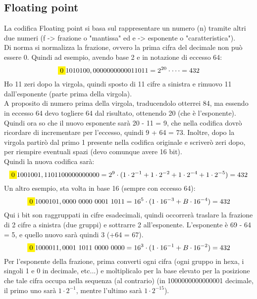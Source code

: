 \documentclass[12pt]{article}
\begin{document}
\subsection{Floating point}
La codifica Floating point si basa sul rappresentare un numero (n) tramite altri due numeri (f -> frazione o "mantissa" ed e -> esponente o "caratteristica").\\
Di norma si normalizza la frazione, ovvero la prima cifra del decimale non può essere 0. Quindi ad esempio, avendo base 2 e in notazione di eccesso 64:
\[
    \colorbox{yellow}{0}1010100,0000000000011011 = 2^{20} \cdot \dots = 432
\]
Ho 11 zeri dopo la virgola, quindi sposto di 11 cifre a sinistra e rimuovo 11 dall'esponente (parte prima della virgola).\\
A proposito di numero prima della virgola, traducendolo otterrei 84, ma essendo in eccesso 64 devo togliere 64 dal risultato, ottenendo 20 (che è l'esponente). Quindi ora so che il nuovo esponente sarà 20 - 11 = 9, che nella codifica dovrò ricordare di incrementare per l'eccesso, quindi 9 + 64 = 73. Inoltre, dopo la virgola partirò dal primo 1 presente nella codifica originale e scriverò zeri dopo, per riempire eventuali spazi (devo comunque avere 16 bit).\\
Quindi la nuova codifica sarà:
\[
    \colorbox{yellow}{0}1001001,1101100000000000 = 2^9 \cdot (1 \cdot 2^{-1} + 1 \cdot 2^{-2} + 1 \cdot 2^{-4} + 1 \cdot 2^{-5}) = 432    
\]
Un altro esempio, sta volta in base 16 (sempre con eccesso 64):
\[
    \colorbox{yellow}{0}1000101,0000 \text{ } 0000 \text{ } 0001 \text{ } 1011 = 16^5 \cdot (1 \cdot 16^{-3} + B \cdot 16^{-4}) = 432
\]
Qui i bit son raggruppati in cifre esadecimali, quindi occorrerà traslare la frazione di 2 cifre a sinistra (due gruppi) e sottrarre 2 all'esponente. L'esponente è 69 - 64 = 5, e quello nuovo sarà quindi 3 (+64 = 67).
\[
    \colorbox{yellow}{0}1000011,0001 \text{ } 1011 \text{ } 0000 \text{ } 0000 = 16^3 \cdot (1 \cdot 16^{-1} + B \cdot 16^{-2}) = 432
\]
Per l'esponente della frazione, prima converti ogni cifra (ogni gruppo in hexa, i singoli 1 e 0 in decimale, etc...) e moltiplicalo per la base elevato per la posizione che tale cifra occupa nella sequenza (al contrario) (in 1000000000000001 decimale, il primo uno sarà $1 \cdot 2^{-1}$, mentre l'ultimo sarà $1 \cdot 2^{-15}$).
\end{document}
